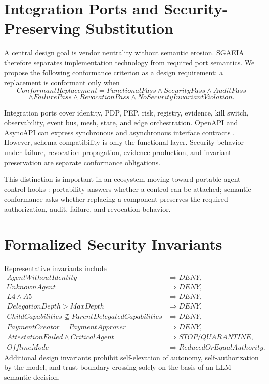 \documentclass[11pt]{article}
\newcommand{\sgaeia}{\textsc{SGAEIA}}
\begin{document}
\section{Integration Ports and Security-Preserving Substitution}
A central design goal is vendor neutrality without semantic erosion. \sgaeia{} therefore separates implementation technology from required port semantics. We propose the following conformance criterion as a design requirement: a replacement is conformant only when
\[
ConformantReplacement = FunctionalPass\land SecurityPass\land AuditPass
\]
\[
\land FailurePass\land RevocationPass\land NoSecurityInvariantViolation.
\]

Integration ports cover identity, PDP, PEP, risk, registry, evidence, kill switch, observability, event bus, mesh, state, and edge orchestration. OpenAPI and AsyncAPI can express synchronous and asynchronous interface contracts \cite{openapi32,asyncapi31}. However, schema compatibility is only the functional layer. Security behavior under failure, revocation propagation, evidence production, and invariant preservation are separate conformance obligations.

This distinction is important in an ecosystem moving toward portable agent-control hooks \cite{owasp2026acs}: portability answers whether a control can be attached; semantic conformance asks whether replacing a component preserves the required authorization, audit, failure, and revocation behavior.

\section{Formalized Security Invariants}
Representative invariants include
\begin{align*}
AgentWithoutIdentity &\Rightarrow DENY,\\
UnknownAgent &\Rightarrow DENY,\\
L4\land A5 &\Rightarrow DENY,\\
DelegationDepth>MaxDepth &\Rightarrow DENY,\\
ChildCapabilities\nsubseteq ParentDelegatedCapabilities &\Rightarrow DENY,\\
PaymentCreator=PaymentApprover &\Rightarrow DENY,\\
AttestationFailed\land CriticalAgent &\Rightarrow STOP/QUARANTINE,\\
OfflineMode &\Rightarrow ReducedOrEqualAuthority.
\end{align*}
Additional design invariants prohibit self-elevation of autonomy, self-authorization by the model, and trust-boundary crossing solely on the basis of an LLM semantic decision.
\end{document}
